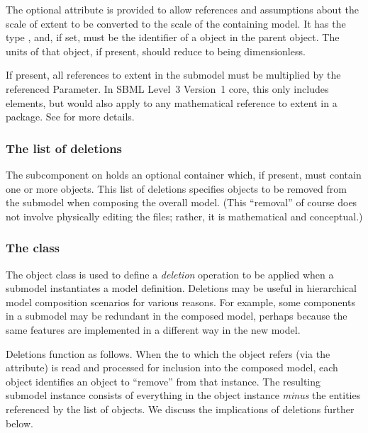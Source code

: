 The optional  attribute is provided to allow
references and assumptions about the scale of extent to be converted to 
the scale of the containing model.  It has the type ,
and, if set, must be the identifier of a \Parameter object in the 
parent \Model object.  The units of that \Parameter object, if present,
should reduce to being dimensionless.

If present, all references to extent in the submodel must be multiplied
by the referenced Parameter.  In SBML Level~3 Version~1 core, this only
includes \KineticLaw elements, but would also apply to any mathematical 
reference to extent in a package. See  for more details.


\subsubsection{The list of deletions}
\label{listofdeletions}

The  subcomponent on \Submodel holds an optional
\ListOfDeletions container which, if present, must contain one or more
\Deletion objects.  This list of deletions specifies objects to be
removed from the submodel when composing the overall model.  (This
``removal'' of course does not involve physically editing the files;
rather, it is mathematical and conceptual.)


\subsubsection{The  class}
\label{deletion-class}

The \Deletion object class is used to define a \emph{deletion} operation
to be applied when a submodel instantiates a model definition.
Deletions may be useful in hierarchical model composition scenarios for
various reasons.  For example, some components in a submodel may be
redundant in the composed model, perhaps because the same features are
implemented in a different way in the new model.

Deletions function as follows.  When the \Model to which the \Submodel
object refers (via the  attribute) is read and processed
for inclusion into the composed model, each \Deletion object identifies
an object to ``remove'' from that \Model instance.  The resulting
submodel instance consists of everything in the \Model object instance
\emph{minus} the entities referenced by the list of \Deletion objects.
We discuss the implications of deletions further below.

